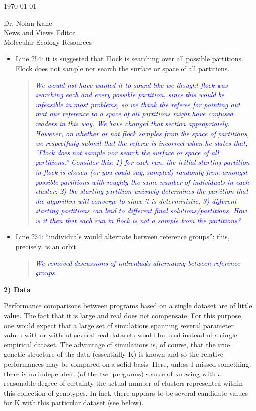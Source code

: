 \documentclass[11pt]{letter}
\newcommand{\reply}[1]{\begin{quotation}\small\sl\textcolor{blue}{#1}\end{quotation}}
\begin{document}
\begin{letter}{ \today 

Dr. Nolan Kane\\
News and Views Editor\\
Molecular Ecology Resources \\
}
\begin{itemize}
\item Line 254: it is suggested that Flock is searching over all possible partitions. Flock does not sample nor search the surface or space of all partitions.
\reply{We would not have wanted it to sound like we thought {\sc flock} was searching
each and every possible
partition, since this would be infeasible in most problems, so we thank the referee for pointing out that our reference to a space of all partitions might
have confused readers in this way.  We have changed that section appropriately.  However, on whether
or not {\sc flock} samples from the space of partitions, we respectfully submit that the referee is
incorrect when he states that, ``Flock does not sample nor search the surface or space of all partitions.'' 
Consider this: 1) for each run, the initial starting partition in {\sc flock} is chosen (or you could say,
sampled) randomly from amongst
possible partitions with roughly the same number of individuals in each cluster; 2) the starting partition uniquely
determines the partition that the algorithm will converge to since it is deterministic, 3) different
starting partitions can lead to different final solutions/partitions.  How is it then that each
run in {\sc flock} is {\em not} a sample from the partitions?  }
\item Line 234: ``individuals would alternate between reference groups'': this, precisely, is an orbit
\reply{We removed discussions of individuals alternating between reference groups.}
\end{itemize}

{\bf 2) Data}

Performance comparisons between programs based on a single dataset are of little value. The fact that it is large and real does not compensate. For this purpose, one would expect that a large set of simulations spanning several parameter values with or without several real datasets would be used instead of a single empirical dataset. The advantage of simulations is, of course, that the true genetic structure of the data (essentially K) is known and so the relative performances may be compared on a solid basis. Here, unless I missed something, there is no independent (of the two programs) source of knowing with a reasonable degree of certainty the actual number of clusters represented within this collection of genotypes. In fact, there appears to be several candidate values for K with this particular dataset (see below).


\end{letter}
\end{document}
